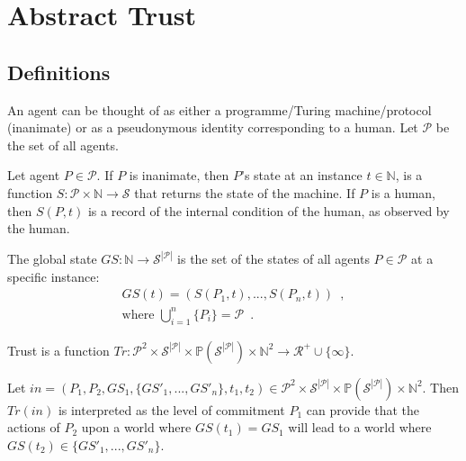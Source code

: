 \section*{Abstract Trust}
  \subsection{Definitions}
    \begin{definition}[Agent]
       An agent can be thought of as either a programme/Turing machine/protocol (inanimate) or as a pseudonymous identity
       corresponding to a human. Let $\mathcal{P}$ be the set of all agents.
    \end{definition}
    \begin{definition}[State]
      Let agent $P \in \mathcal{P}$. If $P$ is inanimate, then $P$'s state at an instance $t \in \mathbb{N}$, is a function $S :
      \mathcal{P} \times \mathbb{N} \rightarrow \mathcal{S}$ that returns the state of the machine. If $P$ is a human, then
      $S\left(P, t\right)$ is a record of the internal condition of the human, as observed by the human.
    \end{definition}
    \begin{definition}
      The global state $GS : \mathbb{N} \rightarrow \mathcal{S}^{|\mathcal{P}|}$ is the set of the states of all agents $P \in
      \mathcal{P}$ at a specific instance: 
      \begin{gather*}
        GS\left(t\right) = \left(S\left(P_1, t\right), ...,S\left(P_n, t\right)\right) \enspace, \\
        \mbox{where } \bigcup\limits_{i = 1}^n\{P_i\} = \mathcal{P} \enspace.
      \end{gather*}
    \end{definition}
    \begin{definition}[Trust]
      Trust is a function $Tr : \mathcal{P}^2 \times \mathcal{S}^{|\mathcal{P}|} \times
      \mathbb{P}\left(\mathcal{S}^{|\mathcal{P}|}\right) \times \mathbb{N}^2 \rightarrow \mathcal{R}^{+} \cup \{\infty\}$.
    \end{definition}
    \noindent Let $in = \left(P_1, P_2, GS_1, \{GS'_1, ...,GS'_n\}, t_1, t_2\right) \in \mathcal{P}^2 \times
    \mathcal{S}^{|\mathcal{P}|} \times \mathbb{P}\left(\mathcal{S}^{|\mathcal{P}|}\right) \times \mathbb{N}^2$. Then
    $Tr\left(in\right)$ is interpreted as the level of commitment $P_1$ can provide that the actions of $P_2$ upon a world where
    $GS\left(t_1\right) = GS_1$ will lead to a world where $GS\left(t_2\right) \in \{GS'_1, ...,GS'_n\}$.

